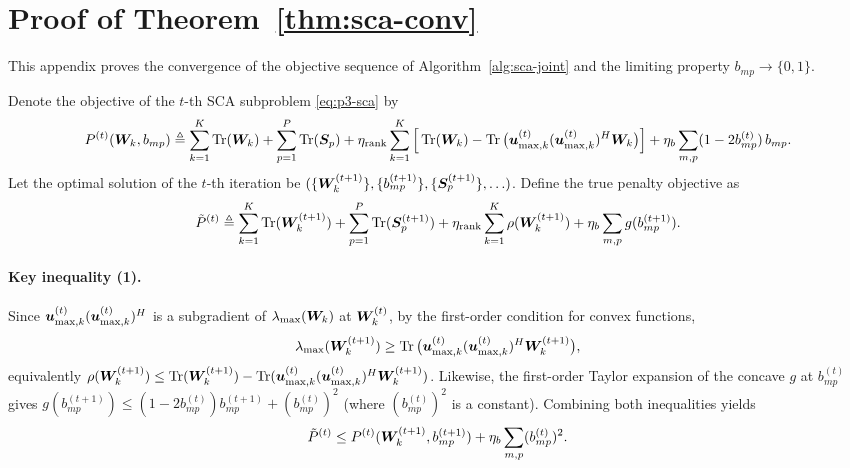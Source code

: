 \section{Proof of Theorem~\ref{thm:sca-conv}}\label{app:proof-sca-conv}

This appendix proves the convergence of the objective sequence of Algorithm~\ref{alg:sca-joint} and the limiting property $b_{mp} \to \{0,1\}$.

Denote the objective of the $t$-th SCA subproblem \eqref{eq:p3-sca} by
\[
P^{(t)}(\bm{W}_k, b_{mp}) \triangleq \sum_{k=1}^K \operatorname{Tr}(\bm{W}_k) + \sum_{p=1}^P \operatorname{Tr}(\bm{S}_p) + \eta_{\text{rank}} \sum_{k=1}^K \Big[ \operatorname{Tr}(\bm{W}_k) - \operatorname{Tr}\big( \bm{u}_{\max,k}^{(t)} (\bm{u}_{\max,k}^{(t)})^H \bm{W}_k \big) \Big] + \eta_b \sum_{m, p} (1 - 2 b_{mp}^{(t)}) \, b_{mp}.
\]
Let the optimal solution of the $t$-th iteration be $(\{\bm{W}_k^{(t+1)}\}, \{b_{mp}^{(t+1)}\}, \{\bm{S}_p^{(t+1)}\}, \ldots)$. Define the true penalty objective as
\[
\tilde{P}^{(t)} \triangleq \sum_{k=1}^K \operatorname{Tr}(\bm{W}_k^{(t+1)}) + \sum_{p=1}^P \operatorname{Tr}(\bm{S}_p^{(t+1)}) + \eta_{\text{rank}} \sum_{k=1}^K \rho(\bm{W}_k^{(t+1)}) + \eta_b \sum_{m, p} g(b_{mp}^{(t+1)}).
\]

\paragraph{Key inequality (1).} Since $\bm{u}_{\max,k}^{(t)} (\bm{u}_{\max,k}^{(t)})^H$ is a subgradient of $\lambda_{\max}(\bm{W}_k)$ at $\bm{W}_k^{(t)}$, by the first-order condition for convex functions,
\[
\lambda_{\max}(\bm{W}_k^{(t+1)}) \geq \operatorname{Tr}\big( \bm{u}_{\max,k}^{(t)} (\bm{u}_{\max,k}^{(t)})^H \bm{W}_k^{(t+1)} \big),
\]
equivalently $\rho(\bm{W}_k^{(t+1)}) \leq \operatorname{Tr}(\bm{W}_k^{(t+1)}) - \operatorname{Tr}(\bm{u}_{\max,k}^{(t)} (\bm{u}_{\max,k}^{(t)})^H \bm{W}_k^{(t+1)})$. Likewise, the first-order Taylor expansion of the concave $g$ at $b_{mp}^{(t)}$ gives $g(b_{mp}^{(t+1)}) \leq (1-2b_{mp}^{(t)}) b_{mp}^{(t+1)} + (b_{mp}^{(t)})^2$ (where $(b_{mp}^{(t)})^2$ is a constant). Combining both inequalities yields
\[
\tilde{P}^{(t)} \leq P^{(t)}(\bm{W}_k^{(t+1)}, b_{mp}^{(t+1)}) + \eta_b \sum_{m,p} (b_{mp}^{(t)})^2.
\]


